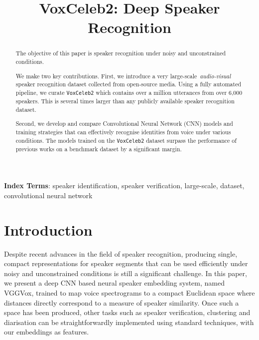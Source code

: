 \documentclass[a4paper]{article}
\title{VoxCeleb2: Deep Speaker Recognition}
\begin{document}
\maketitle
% 
\begin{abstract}

The objective of this paper is speaker recognition under noisy and
unconstrained conditions.

We make two key contributions. First, we introduce a very large-scale~\textit{audio-visual} speaker recognition dataset collected from open-source media. Using a fully automated pipeline, we curate {\tt VoxCeleb2}
which contains over a million utterances from over 6,000 speakers. This is several times larger than any publicly available speaker recognition dataset.

Second, we develop and compare Convolutional Neural Network (CNN) models and training strategies that can effectively recognise identities from voice under various conditions.
The models trained on the  {\tt VoxCeleb2} dataset surpass the
performance of previous works on a benchmark dataset by a significant
margin. \\


\end{abstract}
\noindent\textbf{Index Terms}: speaker identification, speaker verification, large-scale, dataset, convolutional neural network

\let\thefootnote\relax{}


\section{Introduction} 
Despite recent advances in the field of speaker recognition, producing single, compact representations for speaker segments that can be used efficiently under noisy and unconstrained conditions is still a significant challenge. In this paper, we present a deep CNN based neural speaker embedding system, named VGGVox, trained to map voice spectrograms to a compact Euclidean space where distances directly correspond to a measure of speaker similarity. Once such a space has been produced, other tasks such as speaker verification, clustering and diarisation can be straightforwardly implemented using standard techniques, with our embeddings as features.
\end{document}

